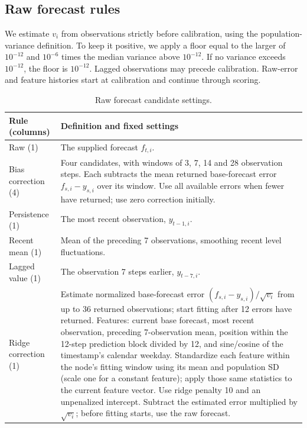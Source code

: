 \section{}\label{sec:implementation}

\subsection{Raw forecast rules}
We estimate $v_i$ from observations strictly before calibration, using
the population-variance definition. To keep it positive, we apply a floor
equal to the larger of $10^{-12}$ and $10^{-6}$ times the median variance
above $10^{-12}$. If no variance exceeds $10^{-12}$, the floor is
$10^{-12}$.
Lagged observations may precede calibration. Raw-error and feature
histories start at calibration and continue through scoring.

\begin{table}[htbp]\centering\color{red}\small
\caption{Raw forecast candidate settings.}\label{tab:expertconfig}
\begin{tabular}{@{}p{.20\linewidth}p{.75\linewidth}@{}}\toprule
Rule (columns) & Definition and fixed settings\\\midrule
Raw (1) & The supplied forecast $f_{t,i}$.\\
Bias correction (4) & Four candidates, with windows of 3, 7, 14 and 28 observation steps. Each subtracts the mean returned base-forecast error $f_{s,i}-y_{s,i}$ over its window. Use all available errors when fewer have returned; use zero correction initially.\\
Persistence (1) & The most recent observation, $y_{t-1,i}$.\\
Recent mean (1) & Mean of the preceding 7 observations, smoothing recent level fluctuations.\\
Lagged value (1) & The observation 7 steps earlier, $y_{t-7,i}$.\\
Ridge correction (1) & Estimate normalized base-forecast error $(f_{s,i}-y_{s,i})/\sqrt{v_i}$ from up to 36 returned observations; start fitting after 12 errors have returned. Features: current base forecast, most recent observation, preceding 7-observation mean, position within the 12-step prediction block divided by 12, and sine/cosine of the timestamp's calendar weekday. Standardize each feature within the node's fitting window using its mean and population SD (scale one for a constant feature); apply those same statistics to the current feature vector. Use ridge penalty 10 and an unpenalized intercept. Subtract the estimated error multiplied by $\sqrt{v_i}$; before fitting starts, use the raw forecast.\\\bottomrule
\end{tabular}\end{table}

